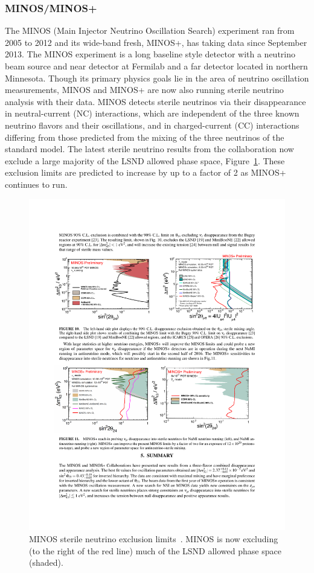 \documentclass[aps,prd,twocolumn,nofootinbib]{revtex4-1}
\begin{document}
\subsubsection{MINOS/MINOS+}
The MINOS (Main Injector Neutrino Oscillation Search) experiment ran from 2005 to 2012 and its wide-band fresh, MINOS+, has taking data since September 2013. The MINOS experiment is a long baseline style detector with a neutrino beam source and near detector at Fermilab and a far detector located in northern Minnesota. Though its primary physics goals lie in the area of neutrino oscillation measurements, MINOS and MINOS+ are now also running sterile neutrino analysis with their data. MINOS detects sterile neutrinos via their disappearance in neutral-current (NC) interactions, which are independent of the three known neutrino flavors and their oscillations, and in charged-current (CC) interactions differing from those predicted from the mixing of the three neutrinos of the standard model. The latest sterile neutrino results from the collaboration \cite{MINOS} now exclude a large majority of the LSND allowed phase space, Figure~\ref{fig:MINOS}. These exclusion limits are predicted to increase by up to a factor of 2 as MINOS+ continues to run.

\begin{figure}[H]
  \centering
  \includegraphics[width=1\columnwidth]{../figures/minos2.pdf}
  \caption{MINOS sterile neutrino exclusion limits~\cite{MINOS}. MINOS is now excluding (to the right of the red line) much of the LSND allowed phase space (shaded).}
  \label{fig:MINOS}
\end{figure}
\end{document}
